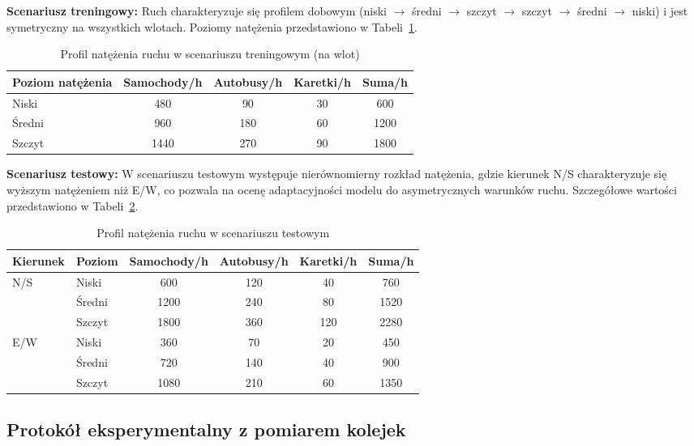 \documentclass[12pt,a4paper]{article}
\begin{document}
\textbf{Scenariusz treningowy:} Ruch charakteryzuje się profilem dobowym (niski $\rightarrow$ średni $\rightarrow$ szczyt $\rightarrow$ szczyt $\rightarrow$ średni $\rightarrow$ niski) i jest symetryczny na wszystkich wlotach. Poziomy natężenia przedstawiono w Tabeli~\ref{tab:2}.

\begin{table}[H]
\centering
\caption{Profil natężenia ruchu w scenariuszu treningowym (na wlot)}
\label{tab:2}
\begin{tabular}{lcccc}
\toprule
Poziom natężenia & Samochody/h & Autobusy/h & Karetki/h & Suma/h \\
\midrule
Niski & 480 & 90 & 30 & 600 \\
Średni & 960 & 180 & 60 & 1200 \\
Szczyt & 1440 & 270 & 90 & 1800 \\
\bottomrule
\end{tabular}
\end{table}

\textbf{Scenariusz testowy:} W scenariuszu testowym występuje nierównomierny rozkład natężenia, gdzie kierunek N/S charakteryzuje się wyższym natężeniem niż E/W, co pozwala na ocenę adaptacyjności modelu do asymetrycznych warunków ruchu. Szczegółowe wartości przedstawiono w Tabeli~\ref{tab:3}.

\begin{table}[H]
\centering
\caption{Profil natężenia ruchu w scenariuszu testowym}
\label{tab:3}
\begin{tabular}{llcccc}
\toprule
Kierunek & Poziom & Samochody/h & Autobusy/h & Karetki/h & Suma/h \\
\midrule
\multirow{3}{*}{N/S} & Niski & 600 & 120 & 40 & 760 \\
 & Średni & 1200 & 240 & 80 & 1520 \\
 & Szczyt & 1800 & 360 & 120 & 2280 \\
\midrule
\multirow{3}{*}{E/W} & Niski & 360 & 70 & 20 & 450 \\
 & Średni & 720 & 140 & 40 & 900 \\
 & Szczyt & 1080 & 210 & 60 & 1350 \\
\bottomrule
\end{tabular}
\end{table}

\subsection{Protokół eksperymentalny z pomiarem kolejek}
\end{document}
